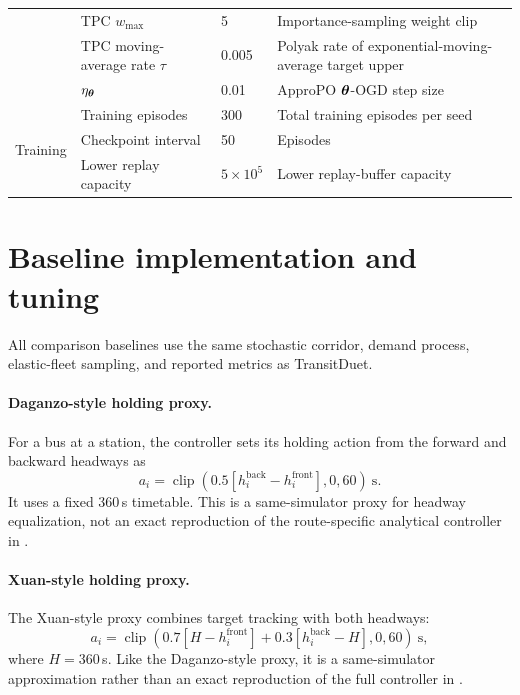 \begin{table}[H]
\begin{tabular}{@{}p{}p{}p{}p{}@{}}
  & TPC $w_{\max}$            & 5             & Importance-sampling weight clip \\
  & TPC moving-average rate $\tau$ & 0.005     & Polyak rate of exponential-moving-average target upper \\
  & $\eta_{\boldsymbol{\theta}}$        & 0.01          & ApproPO $\boldsymbol{\theta}$-OGD step size \\
\midrule
\multirow{3}{*}{Training}
  & Training episodes       & 300     & Total training episodes per seed \\
  & Checkpoint interval            & 50      & Episodes \\
  & Lower replay capacity  & $5 \times 10^{5}$ & Lower replay-buffer capacity \\
\bottomrule
\end{tabular}
\end{table}

\section{Baseline implementation and tuning}
\label{app:baseline_details}

All comparison baselines use the same stochastic corridor, demand process, elastic-fleet sampling, and reported metrics as TransitDuet.

\paragraph{Daganzo-style holding proxy.}
For a bus at a station, the controller sets its holding action from the forward and backward headways as
\begin{equation}
  a_i = \operatorname{clip}\!\left(0.5\left[h_i^{\mathrm{back}}-h_i^{\mathrm{front}}\right],0,60\right)\ \mathrm{s}.
\end{equation}
It uses a fixed 360\,s timetable. This is a same-simulator proxy for headway equalization, not an exact reproduction of the route-specific analytical controller in \citep{daganzo2009headway}.

\paragraph{Xuan-style holding proxy.}
The Xuan-style proxy combines target tracking with both headways:
\begin{equation}
  a_i = \operatorname{clip}\!\left(0.7\left[H-h_i^{\mathrm{front}}\right]+0.3\left[h_i^{\mathrm{back}}-H\right],0,60\right)\ \mathrm{s},
\end{equation}
where $H=360$\,s. Like the Daganzo-style proxy, it is a same-simulator approximation rather than an exact reproduction of the full controller in \citep{xuan2011dynamic}.

